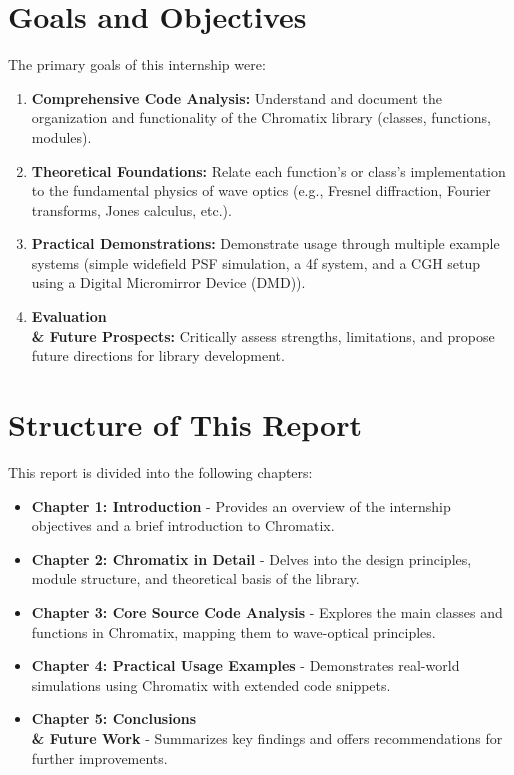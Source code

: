 \documentclass[a4paper,12pt]{report}
\begin{document}
\section{Goals and Objectives}
The primary goals of this internship were:
\begin{enumerate}
    \item \textbf{Comprehensive Code Analysis:} Understand and document the organization and functionality of the Chromatix library (classes, functions, modules).
    \item \textbf{Theoretical Foundations:} Relate each function's or class's implementation to the fundamental physics of wave optics (e.g., Fresnel diffraction, Fourier transforms, Jones calculus, etc.).
    \item \textbf{Practical Demonstrations:} Demonstrate usage through multiple example systems (simple widefield PSF simulation, a 4f system, and a CGH setup using a Digital Micromirror Device (DMD)).
    \item \textbf{Evaluation \\& Future Prospects:} Critically assess strengths, limitations, and propose future directions for library development.
\end{enumerate}

\section{Structure of This Report}
This report is divided into the following chapters:
\begin{itemize}
    \item \textbf{Chapter 1: Introduction} - Provides an overview of the internship objectives and a brief introduction to Chromatix.
    \item \textbf{Chapter 2: Chromatix in Detail} - Delves into the design principles, module structure, and theoretical basis of the library.
    \item \textbf{Chapter 3: Core Source Code Analysis} - Explores the main classes and functions in Chromatix, mapping them to wave-optical principles.
    \item \textbf{Chapter 4: Practical Usage Examples} - Demonstrates real-world simulations using Chromatix with extended code snippets.
    \item \textbf{Chapter 5: Conclusions \\& Future Work} - Summarizes key findings and offers recommendations for further improvements.
\end{itemize}
\end{document}
